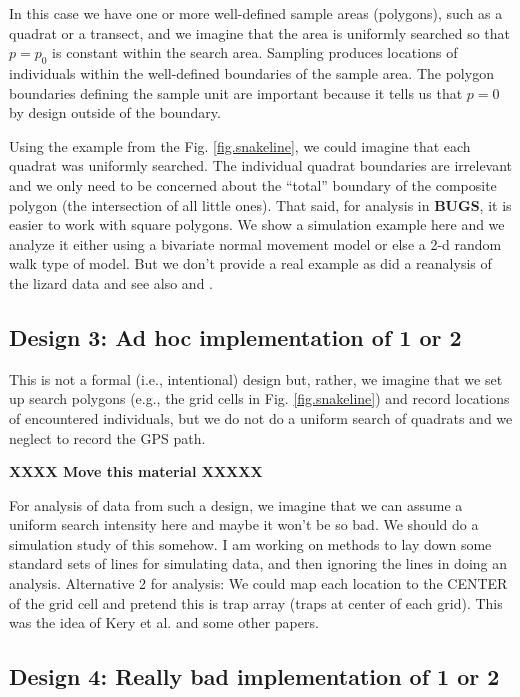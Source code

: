  In this case we
have one or more well-defined sample areas (polygons), such as a
quadrat or a transect, and we imagine that the area is uniformly
searched so that $p = p_0$ is constant within the search area.
Sampling produces locations of individuals within the well-defined
boundaries of the sample area. The polygon boundaries defining the
sample unit are important because it tells us that $p=0$ by design
outside of the boundary.

Using the example from the Fig. \ref{fig.snakeline}, we could imagine that each
quadrat was uniformly searched. The individual quadrat boundaries are
irrelevant and we only need to be concerned about the ``total''
boundary of the composite polygon (the intersection of all little
ones). That said, for analysis in {\bf BUGS}, it is easier to work with square
polygons.  We show a simulation example here and we analyze it either
using a bivariate normal movement model or else a 2-d random walk type
of model.  But we don't provide a real example as \citet{royle_dorazio:2008}
did a reanalysis of the lizard data and see also
\citet{efford:2011ecol} and \citet{marques_etal:2011}.


\subsection{ Design 3: Ad hoc implementation of 1 or 2} 

This is not a formal (i.e., intentional) design but, rather, we
imagine that we set up 
search polygons (e.g., the grid cells in Fig. \ref{fig.snakeline}) and
record 
locations of encountered individuals, but we do not do a uniform search
of quadrats and we neglect to record the GPS path.  

{\bf XXXX Move this material XXXXX}

For analysis of data from such a design, 
we imagine that we can assume a uniform search intensity here
and maybe it won't be so bad.  We should do a simulation study of this
somehow. I am working on methods to lay down some standard sets of
lines for simulating data, and then ignoring the lines in doing an
analysis.  Alternative 2 for analysis: We could map each location to
the CENTER of the grid cell and pretend this is trap array (traps at
center of each grid). This was the idea of Kery et al. and some other
papers.


\subsection{Design 4: Really bad implementation of 1 or 2} 

